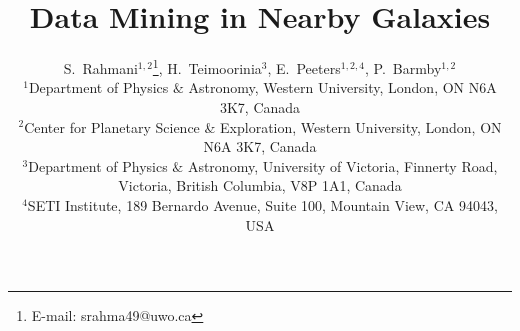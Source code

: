 \documentclass[useAMS,usenatbib]{mn2e}
\begin{document}
\title{Data Mining in Nearby Galaxies}
\author[S. Rahmani, et. al.]{S.~Rahmani$^{1, 2}$\thanks{E-mail:
srahma49@uwo.ca}, H.~Teimoorinia$^{3}$, E.~Peeters$^{1, 2, 4}$, P.~Barmby$^{1, 2}$\\
$^{1}$Department of Physics $\&$ Astronomy, Western University, London, ON N6A 3K7, Canada\\
$^{2}$Center for Planetary Science \& Exploration, Western University, London, ON N6A 3K7, Canada\\
$^{3}$Department of Physics $\&$ Astronomy, University of Victoria, Finnerty Road, Victoria, British Columbia, V8P 1A1, Canada\\
$^{4}$SETI Institute, 189 Bernardo Avenue, Suite 100, Mountain View, CA 94043, USA}
\maketitle

\end{document}
